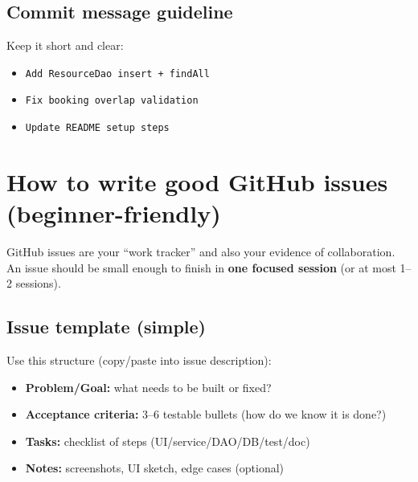 \documentclass[11pt]{article}
\begin{document}
\subsection{Commit message guideline}
Keep it short and clear:
\begin{itemize}
  \item \texttt{Add ResourceDao insert + findAll}
  \item \texttt{Fix booking overlap validation}
  \item \texttt{Update README setup steps}
\end{itemize}

\section{How to write good GitHub issues (beginner-friendly)}
GitHub issues are your ``work tracker'' and also your evidence of collaboration.
An issue should be small enough to finish in \textbf{one focused session} (or at most 1--2 sessions).

\subsection{Issue template (simple)}
Use this structure (copy/paste into issue description):
\begin{itemize}
  \item \textbf{Problem/Goal:} what needs to be built or fixed?
  \item \textbf{Acceptance criteria:} 3--6 testable bullets (how do we know it is done?)
  \item \textbf{Tasks:} checklist of steps (UI/service/DAO/DB/test/doc)
  \item \textbf{Notes:} screenshots, UI sketch, edge cases (optional)
\end{itemize}
\end{document}
